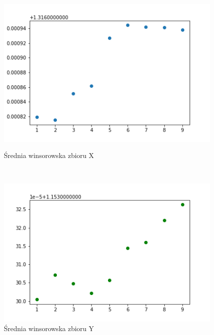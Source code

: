 \documentclass[12pt]{mwart}
\begin{document}
\begin{figure}[H]
	\begin{minipage}{.5\linewidth}
		\centering
		\includegraphics[scale=0.7]{X_wins.PNG}
		\caption{Średnia winsorowska zbioru X}
	\end{minipage}
	$\quad$
	\begin{minipage}{.5\linewidth}
		\centering
		\includegraphics[scale=0.7]{Y_wins.PNG}
		\caption{Średnia winsorowska zbioru Y}
	\end{minipage}
\end{figure}
\end{document}
